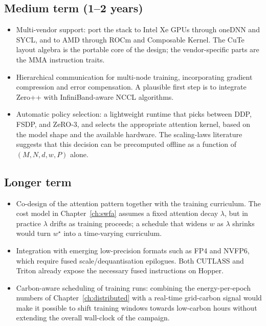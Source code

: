 \subsection{Medium term (1--2 years)}\label{sec:concl_medium}
\begin{itemize}
    \item Multi-vendor support: port the stack to Intel Xe GPUs
          through oneDNN and SYCL, and to AMD through ROCm and
          Composable Kernel. The CuTe layout algebra is the
          portable core of the design; the vendor-specific parts
          are the MMA instruction traits.
    \item Hierarchical communication for multi-node training,
          incorporating gradient compression and error
          compensation. A plausible first step is to integrate
          Zero++ with InfiniBand-aware NCCL algorithms.
    \item Automatic policy selection: a lightweight runtime that
          picks between DDP, FSDP, and ZeRO-3, and selects the
          appropriate attention kernel, based on the model shape
          and the available hardware. The scaling-laws
          literature~\cite{hoffmann2022chinchilla} suggests that
          this decision can be precomputed offline as a function
          of $(M, N, d, w, P)$ alone.
\end{itemize}

\subsection{Longer term}\label{sec:concl_long}
\begin{itemize}
    \item Co-design of the attention pattern together with the
          training curriculum. The cost model in
          Chapter~\ref{ch:swfa} assumes a fixed attention decay
          $\lambda$, but in practice $\lambda$ drifts as training
          proceeds; a schedule that widens $w$ as $\lambda$
          shrinks would turn $w^\star$ into a time-varying
          curriculum.
    \item Integration with emerging low-precision formats such
          as FP4 and NVFP6, which require fused
          scale/dequantisation epilogues. Both CUTLASS and
          Triton already expose the necessary fused instructions
          on Hopper.
    \item Carbon-aware scheduling of training runs: combining
          the energy-per-epoch numbers of
          Chapter~\ref{ch:distributed} with a real-time
          grid-carbon signal would make it possible to shift
          training windows towards low-carbon hours without
          extending the overall wall-clock of the campaign.
\end{itemize}

